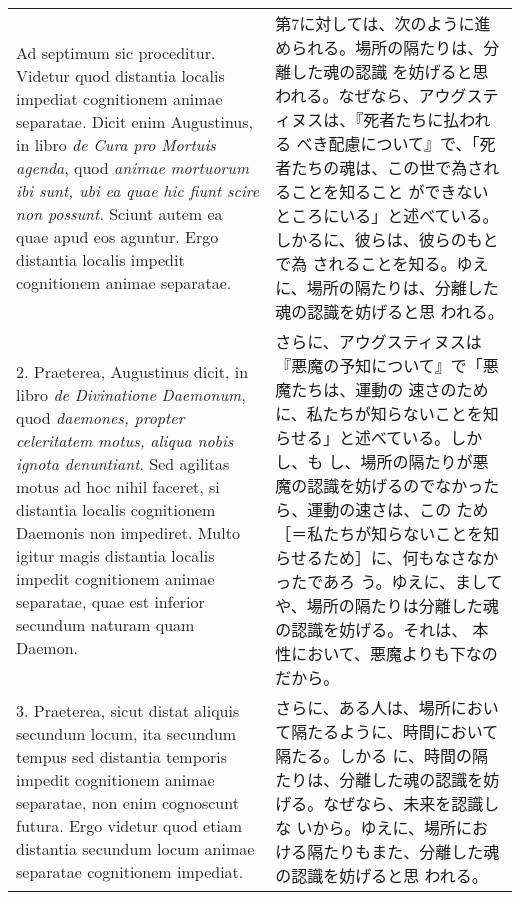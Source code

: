 \documentclass[10pt]{jsarticle} %
\begin{document}
\begin{longtable}{p{21em}p{21em}}

{\huge A}{\sc d septimum sic proceditur}. Videtur quod distantia
localis impediat cognitionem animae separatae. Dicit enim Augustinus,
in libro {\it de Cura pro Mortuis agenda}, quod {\it animae mortuorum
ibi sunt, ubi ea quae hic fiunt scire non possunt}. Sciunt autem ea
quae apud eos aguntur. Ergo distantia localis impedit cognitionem
animae separatae.

&

第7に対しては、次のように進められる。場所の隔たりは、分離した魂の認識
を妨げると思われる。なぜなら、アウグスティヌスは、『死者たちに払われる
べき配慮について』で、「死者たちの魂は、この世で為されることを知ること
ができないところにいる」と述べている。しかるに、彼らは、彼らのもとで為
されることを知る。ゆえに、場所の隔たりは、分離した魂の認識を妨げると思
われる。

\\



2. {\sc Praeterea}, Augustinus dicit, in libro {\it de Divinatione
Daemonum}, quod {\it daemones, propter celeritatem motus, aliqua nobis
ignota denuntiant}. Sed agilitas motus ad hoc nihil faceret, si
distantia localis cognitionem Daemonis non impediret. Multo igitur
magis distantia localis impedit cognitionem animae separatae, quae est
inferior secundum naturam quam Daemon.

&

さらに、アウグスティヌスは『悪魔の予知について』で「悪魔たちは、運動の
速さのために、私たちが知らないことを知らせる」と述べている。しかし、も
し、場所の隔たりが悪魔の認識を妨げるのでなかったら、運動の速さは、この
ため［＝私たちが知らないことを知らせるため］に、何もなさなかったであろ
う。ゆえに、ましてや、場所の隔たりは分離した魂の認識を妨げる。それは、
本性において、悪魔よりも下なのだから。

\\



3. {\sc Praeterea}, sicut distat aliquis secundum locum, ita secundum
tempus sed distantia temporis impedit cognitionem animae separatae,
non enim cognoscunt futura. Ergo videtur quod etiam distantia secundum
locum animae separatae cognitionem impediat.

&

さらに、ある人は、場所において隔たるように、時間において隔たる。しかる
に、時間の隔たりは、分離した魂の認識を妨げる。なぜなら、未来を認識しな
いから。ゆえに、場所における隔たりもまた、分離した魂の認識を妨げると思
われる。


\end{longtable}
\end{document}
